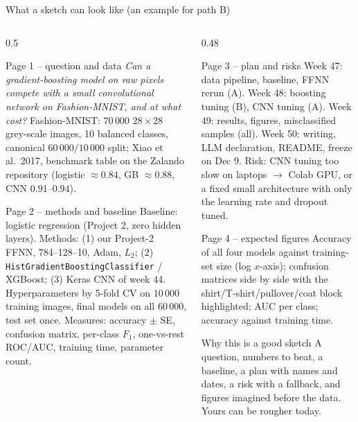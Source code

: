 \documentclass[10pt,aspectratio=169]{beamer}
\begin{document}
\begin{frame}{What a sketch can look like (an example for path B)}
\tiny
\begin{columns}[T]
\begin{column}{0.5\textwidth}
\begin{block}{Page 1 -- question and data}
\emph{Can a gradient-boosting model on raw pixels compete with a small
convolutional network on Fashion-MNIST, and at what cost?}  Fashion-MNIST:
$70\,000$ $28\times 28$ grey-scale images, 10 balanced classes,
canonical $60\,000/10\,000$ split; Xiao et al.\ 2017, benchmark table on the
Zalando repository (logistic $\approx 0.84$, GB $\approx 0.88$, CNN
$0.91$--$0.94$).
\end{block}
\begin{block}{Page 2 -- methods and baseline}
Baseline: logistic regression (Project 2, zero hidden layers).
Methods: (1) our Project-2 FFNN, 784--128--10, Adam, $L_2$; (2)
\texttt{HistGradientBoostingClassifier} / XGBoost; (3) Keras CNN of week 44.
Hyperparameters by 5-fold CV on $10\,000$ training images, final models on
all $60\,000$, test set once.  Measures: accuracy $\pm$ SE, confusion matrix,
per-class $F_1$, one-vs-rest ROC/AUC, training time, parameter count.
\end{block}
\end{column}
\begin{column}{0.48\textwidth}
\begin{block}{Page 3 -- plan and risks}
Week 47: data pipeline, baseline, FFNN rerun (A). Week 48: boosting tuning
(B), CNN tuning (A). Week 49: results, figures, misclassified samples (all).
Week 50: writing, LLM declaration, README, freeze on Dec 9.  Risk: CNN
tuning too slow on laptops $\to$ Colab GPU, or a fixed small
architecture with only the learning rate and dropout tuned.
\end{block}
\begin{block}{Page 4 -- expected figures}
Accuracy of all four models against training-set size (log $x$-axis);
confusion matrices side by side with the shirt/T-shirt/pullover/coat
block highlighted; AUC per class; accuracy against training time.
\end{block}
\begin{block}{Why this is a good sketch}
A question, numbers to beat, a baseline, a plan with names and dates, a
risk with a fallback, and figures imagined before the data.  Yours can be
rougher today.
\end{block}
\end{column}
\end{columns}
\end{frame}
\end{document}

